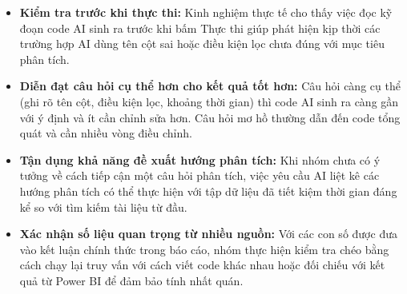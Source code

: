 \begin{itemize}
    \item \textbf{Kiểm tra trước khi thực thi:} Kinh nghiệm thực tế cho thấy việc đọc kỹ đoạn code AI sinh ra trước khi bấm Thực thi giúp phát hiện kịp thời các trường hợp AI dùng tên cột sai hoặc điều kiện lọc chưa đúng với mục tiêu phân tích.

    \item \textbf{Diễn đạt câu hỏi cụ thể hơn cho kết quả tốt hơn:} Câu hỏi càng cụ thể (ghi rõ tên cột, điều kiện lọc, khoảng thời gian) thì code AI sinh ra càng gần với ý định và ít cần chỉnh sửa hơn. Câu hỏi mơ hồ thường dẫn đến code tổng quát và cần nhiều vòng điều chỉnh.

    \item \textbf{Tận dụng khả năng đề xuất hướng phân tích:} Khi nhóm chưa có ý tưởng về cách tiếp cận một câu hỏi phân tích, việc yêu cầu AI liệt kê các hướng phân tích có thể thực hiện với tập dữ liệu đã tiết kiệm thời gian đáng kể so với tìm kiếm tài liệu từ đầu.

    \item \textbf{Xác nhận số liệu quan trọng từ nhiều nguồn:} Với các con số được đưa vào kết luận chính thức trong báo cáo, nhóm thực hiện kiểm tra chéo bằng cách chạy lại truy vấn với cách viết code khác nhau hoặc đối chiếu với kết quả từ Power BI để đảm bảo tính nhất quán.
\end{itemize}

\clearpage
